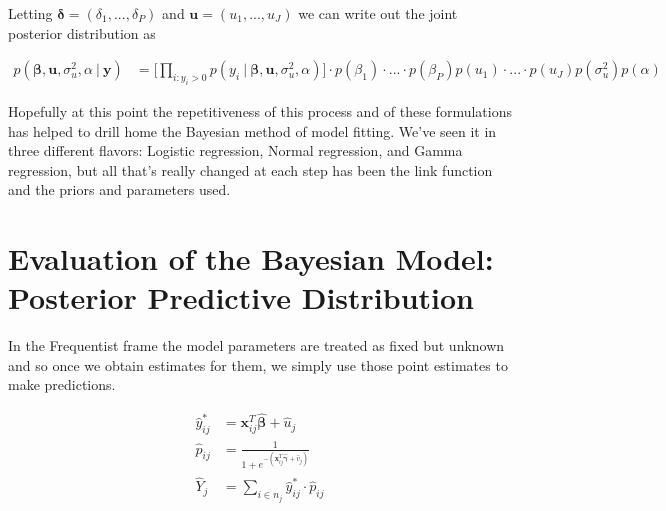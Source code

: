 \documentclass[12pt,twoside]{reedthesis}
\begin{document}
Letting \(\boldsymbol{\delta} = (\delta_1, ..., \delta_P)\) and \(\mathbf{u} = (u_1, ..., u_J)\) we can write out the joint posterior distribution as

\[
\begin{aligned}
p(\boldsymbol{\beta}, \mathbf{u}, \sigma_{u}^2, \alpha \ | \ \mathbf{y}) &=\bigg[\prod_{i:y_{i} > 0}p(y_{i} \ | \ \boldsymbol{\beta},\mathbf{u}, \sigma_{u}^2, \alpha)\bigg]\cdot p(\beta_1)\cdot...\cdot p(\beta_P)p(u_1)\cdot ... \cdot p(u_J)p(\sigma_{u}^2)p( \alpha) 
\end{aligned}
\]

Hopefully at this point the repetitiveness of this process and of these formulations has helped to drill home the Bayesian method of model fitting. We've seen it in three different flavors: Logistic regression, Normal regression, and Gamma regression, but all that's really changed at each step has been the link function and the priors and parameters used.

\hypertarget{evaluation-of-the-bayesian-model-posterior-predictive-distribution}{%
\section{Evaluation of the Bayesian Model: Posterior Predictive Distribution}\label{evaluation-of-the-bayesian-model-posterior-predictive-distribution}}

In the Frequentist frame the model parameters are treated as fixed but unknown and so once we obtain estimates for them, we simply use those point estimates to make predictions.

\[
\begin{aligned}
\hat{y}^*_{ij} &= \mathbf{x}_{ij}^T\hat{\boldsymbol{\beta}} + \hat{u}_j \\
\hat{p}_{ij} &= \frac{1}{1 + e^{-(\mathbf{x}_{ij}^T\hat{\boldsymbol{\gamma}} + \hat{v}_j)}} \\
\hat{Y}_{j} &= \sum_{i\in n_j}\hat{y}^*_{ij}\cdot \hat{p}_{ij} 
\end{aligned}
\]
\end{document}

